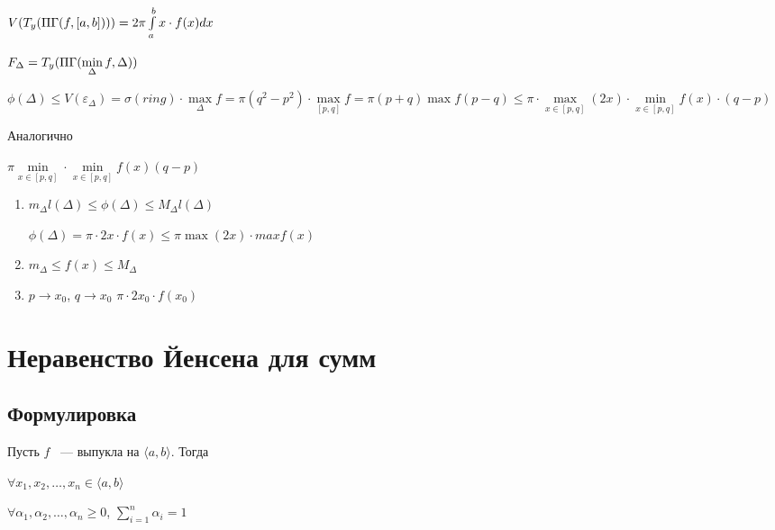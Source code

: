 \documentclass{article}
\begin{document}
            $V(T_y(\Pi\Gamma(f, [a, b]))) = 2 \pi \int\limits^b_a x \cdot f(x) dx$
            
            $F_{\Delta} = T_y(\Pi\Gamma(\min\limits_{\Delta} f, \Delta))$
            
            $\phi(\Delta) \leq V(\varepsilon_{\Delta}) = \sigma(ring) \cdot \max\limits_{\Delta} f = \pi(q^2 - p^2) \cdot \max\limits_{[p, q]} f = \pi (p + q) \max f(p - q) \leq \pi \cdot \max\limits_{x \in [p, q]} (2x) \cdot \min\limits_{x \in [p, q]} f(x) \cdot (q - p)$
            
            Аналогично
            
            $\pi \min\limits_{x \in [p, q]} \cdot \min\limits_{x \in [p, q]} f(x) (q - p)$
            
            \begin{enumerate}
            
                \item $m_{\Delta} l(\Delta) \leq \phi(\Delta) \leq M_{\Delta} l(\Delta)$
                
                    $\phi(\Delta) = \pi \cdot 2 x \cdot f(x) \leq \pi \max (2x) \cdot max f(x)$
                    
                \item $m_{\Delta} \leq f(x) \leq M_{\Delta}$
                
                \item $p \rightarrow x_0$, $q \rightarrow x_0$ $\pi \cdot 2 x_0 \cdot f(x_0)$
                
            \end{enumerate}
        
    \newpage
    
    \section{Неравенство Йенсена для сумм}
    
        \subsection{Формулировка}
        
            Пусть $f$ ~--- выпукла на $\langle a, b \rangle$. Тогда
            
            $\forall x_1, x_2, \ldots, x_n \in \langle a, b \rangle$
            
            $\forall \alpha_1, \alpha_2, \ldots, \alpha_n \geq 0$, $\sum\limits_{i = 1}^n \alpha_i = 1$
            
\end{document}
